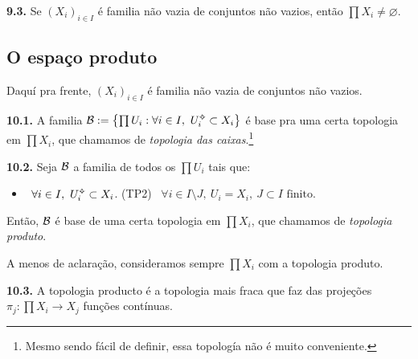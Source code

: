 \begin{proposition}
    \textbf{9.3.} Se \((X_i)_{i \in I}\) é familia não vazia de conjuntos não vazios, então \(\prod X_i \neq \varnothing\).  
\end{proposition}

\subsection*{O espaço produto}

\begin{note}
    Daquí pra frente, \((X_i)_{i\in I}\) é familia não vazia de conjuntos não vazios.
\end{note}

\begin{proposition}
    \textbf{10.1.} A familia \(\B := \left\{\prod U_i : \forall i \in I, \  U_i\ab \subset X_i\right\}\) é base pra uma certa topologia em \(\prod X_i\), que chamamos de \emph{topologia das caixas}.\footnote{Mesmo sendo fácil de definir, essa topología não é muito conveniente.} 
\end{proposition}

\begin{proposition}
    \textbf{10.2.} Seja \(\mathcal{B}\) a familia de todos os \(\prod U_i  \) tais que:
    \vspace{-0.3cm}
    \begin{itemize}[left = 1.8cm]
        \item[(TP1)] \ \(\forall i \in I, \ U_i\ab \subset X_i\). \hfill  (TP2) \ \( \forall i \in I\setminus J, \ U_i = X_i,  \ J\subset I \text{ finito}\). 
    \end{itemize}
    \vspace{-0.3cm}
    Então, \(\mathcal{B}\) é base de uma certa topologia em \(\prod X_i\), que chamamos de \emph{topologia produto}.
\end{proposition}


\begin{note}
    A menos de aclaração, consideramos sempre \( \prod X_i\) com a topologia produto. 
\end{note}
\begin{proposition}
    \textbf{10.3.} A topologia producto é a topologia mais fraca que faz das projeções \(\pi_j : \prod X_i \to X_j\) funções contínuas. 
\end{proposition}

